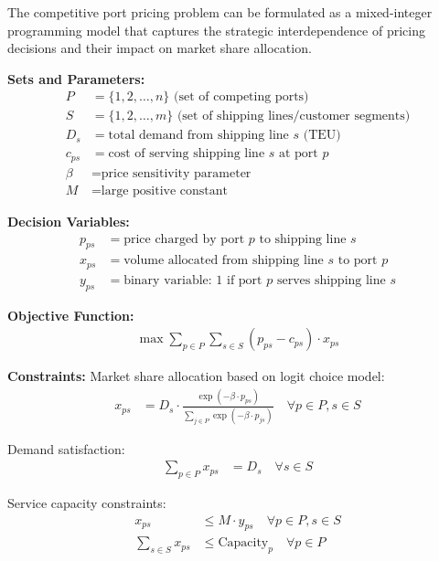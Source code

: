 \documentclass{article}
\begin{document}
The competitive port pricing problem can be formulated as a mixed-integer programming model that captures the strategic interdependence of pricing decisions and their impact on market share allocation.

\textbf{Sets and Parameters:}
\begin{align}
P &= \{1, 2, \ldots, n\} \text{ (set of competing ports)} \\
S &= \{1, 2, \ldots, m\} \text{ (set of shipping lines/customer segments)} \\
D_s &= \text{total demand from shipping line } s \text{ (TEU)} \\
c_{ps} &= \text{cost of serving shipping line } s \text{ at port } p \\
\beta &= \text{price sensitivity parameter} \\
M &= \text{large positive constant}
\end{align}

\textbf{Decision Variables:}
\begin{align}
p_{ps} &= \text{price charged by port } p \text{ to shipping line } s \\
x_{ps} &= \text{volume allocated from shipping line } s \text{ to port } p \\
y_{ps} &= \text{binary variable: 1 if port } p \text{ serves shipping line } s
\end{align}

\textbf{Objective Function:}
\begin{align}
\max \sum_{p \in P} \sum_{s \in S} (p_{ps} - c_{ps}) \cdot x_{ps}
\end{align}

\textbf{Constraints:}
Market share allocation based on logit choice model:
\begin{align}
x_{ps} &= D_s \cdot \frac{\exp(-\beta \cdot p_{ps})}{\sum_{j \in P} \exp(-\beta \cdot p_{js})} \quad \forall p \in P, s \in S
\end{align}

Demand satisfaction:
\begin{align}
\sum_{p \in P} x_{ps} &= D_s \quad \forall s \in S
\end{align}

Service capacity constraints:
\begin{align}
x_{ps} &\leq M \cdot y_{ps} \quad \forall p \in P, s \in S \\
\sum_{s \in S} x_{ps} &\leq \text{Capacity}_p \quad \forall p \in P
\end{align}
\end{document}
